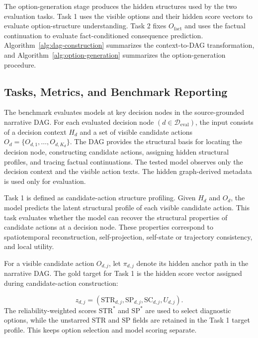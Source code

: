 \documentclass[pdflatex,sn-mathphys-num]{sn-jnl}%
\theoremstyle{thmstyleone}%
\theoremstyle{thmstyletwo}%
\theoremstyle{thmstylethree}%
\begin{document}
The option-generation stage produces the hidden structures used by the two evaluation tasks. Task 1 uses the visible options and their hidden score vectors to evaluate option-structure understanding. Task 2 fixes $O_{\mathrm{fact}}$ and uses the factual continuation to evaluate fact-conditioned consequence prediction. Algorithm~\ref{alg:dag-construction} summarizes the context-to-DAG transformation, and Algorithm~\ref{alg:option-generation} summarizes the option-generation procedure.


\subsection{Tasks, Metrics, and Benchmark Reporting}
The benchmark evaluates models at key decision nodes in the source-grounded narrative DAG. For each evaluated decision node $(d\in\mathcal{D}_{\mathrm{eval}})$, the input consists of a decision context $H_d$ and a set of visible candidate actions $O_d=\{O_{d,1},\ldots,O_{d,K_d}\}$. The DAG provides the structural basis for locating the decision node, constructing candidate actions, assigning hidden structural profiles, and tracing factual continuations. The tested model observes only the decision context and the visible action texts. The hidden graph-derived metadata is used only for evaluation.

Task 1 is defined as candidate-action structure profiling. Given $H_d$ and $O_d$, the model predicts the latent structural profile of each visible candidate action. This task evaluates whether the model can recover the structural properties of candidate actions at a decision node. These properties correspond to spatiotemporal reconstruction, self-projection, self-state or trajectory consistency, and local utility.

For a visible candidate action $O_{d,j}$, let $\pi_{d,j}$ denote its hidden anchor path in the narrative DAG. The gold target for Task 1 is the hidden score vector assigned during candidate-action construction:

\begin{equation}
z_{d,j}=(\mathrm{STR}_{d,j},\mathrm{SP}_{d,j},\mathrm{SC}_{d,j},U_{d,j}).
\end{equation}
The reliability-weighted scores $\mathrm{STR}^{*}$ and $\mathrm{SP}^{*}$ are used to select diagnostic options, while the unstarred $\mathrm{STR}$ and $\mathrm{SP}$ fields are retained in the Task 1 target profile. This keeps option selection and model scoring separate.
\end{document}
